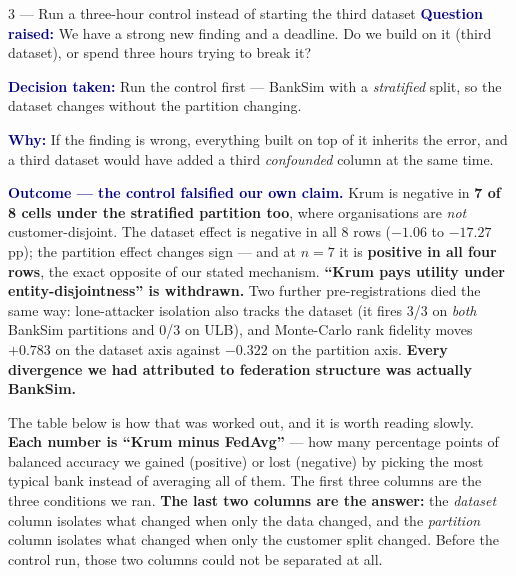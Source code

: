 \documentclass[11pt]{article}
\newcommand{\qlabel}[1]{\textbf{\textcolor{navy}{#1}}\;}
\begin{document}
\begin{decision}{3 --- Run a three-hour control instead of starting the third dataset}
\qlabel{Question raised:} We have a strong new finding and a deadline. Do we build on it (third
dataset), or spend three hours trying to break it?

\qlabel{Decision taken:} Run the control first --- BankSim with a \emph{stratified} split, so the
dataset changes without the partition changing.

\qlabel{Why:} If the finding is wrong, everything built on top of it inherits the error, and a third
dataset would have added a third \emph{confounded} column at the same time.

\qlabel{Outcome --- the control falsified our own claim.} Krum is negative in \textbf{7 of 8 cells
under the stratified partition too}, where organisations are \emph{not} customer-disjoint. The dataset
effect is negative in all 8 rows ($-1.06$ to $-17.27$\,pp); the partition effect changes sign --- and at
$n=7$ it is \textbf{positive in all four rows}, the exact opposite of our stated mechanism.
\textbf{``Krum pays utility under entity-disjointness'' is withdrawn.} Two further pre-registrations
died the same way: lone-attacker isolation also tracks the dataset (it fires 3/3 on \emph{both} BankSim
partitions and 0/3 on ULB), and Monte-Carlo rank fidelity moves $+0.783$ on the dataset axis against
$-0.322$ on the partition axis. \textbf{Every divergence we had attributed to federation structure was
actually BankSim.}
\end{decision}

The table below is how that was worked out, and it is worth reading slowly. \textbf{Each number is
``Krum minus FedAvg''} --- how many percentage points of balanced accuracy we gained (positive) or lost
(negative) by picking the most typical bank instead of averaging all of them. The first three columns
are the three conditions we ran. \textbf{The last two columns are the answer:} the \emph{dataset}
column isolates what changed when only the data changed, and the \emph{partition} column isolates what
changed when only the customer split changed. Before the control run, those two columns could not be
separated at all.
\end{document}
